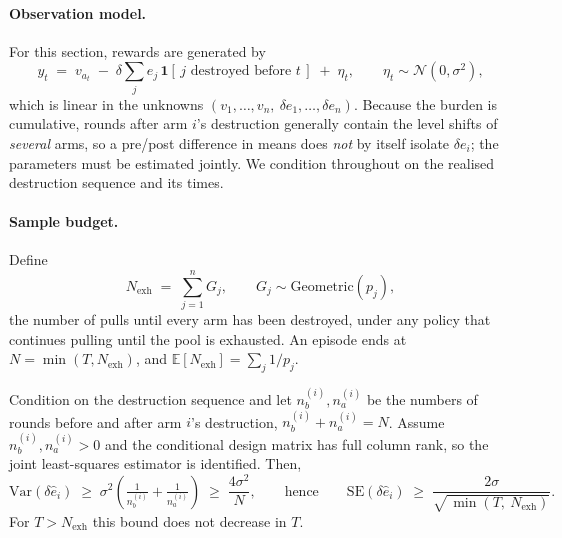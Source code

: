 \paragraph{Observation model.} For this section, rewards are generated by
\[
y_t \;=\; v_{a_t} \;-\; \delta \textstyle\sum_{j} e_j \,\mathbf{1}[\,j \text{ destroyed before } t\,] \;+\; \eta_t ,
\qquad \eta_t \sim \mathcal{N}(0,\sigma^2),
\]
which is linear in the unknowns $(v_1,\dots,v_n,\ \delta e_1,\dots,\delta e_n)$.
Because the burden is cumulative, rounds after arm $i$'s destruction generally
contain the level shifts of \emph{several} arms, so a pre/post difference in means
does \emph{not} by itself isolate $\delta e_i$; the parameters must be estimated
jointly. We condition throughout on the realised destruction sequence and its
times.

\paragraph{Sample budget.} Define
\[
N_{\mathrm{exh}} \;=\; \textstyle\sum_{j=1}^{n} G_j, \qquad G_j \sim \mathrm{Geometric}(p_j),
\]
the number of pulls until every arm has been destroyed, under any policy that
continues pulling until the pool is exhausted. An episode ends at
$N = \min(T, N_{\mathrm{exh}})$, and $\mathbb{E}[N_{\mathrm{exh}}] = \sum_j 1/p_j$.

\begin{theorem}
\label{thm:floor}
Condition on the destruction sequence and let $n_b^{(i)}, n_a^{(i)}$ be the numbers
of rounds before and after arm $i$'s destruction, $n_b^{(i)} + n_a^{(i)} = N$.
Assume $n_b^{(i)}, n_a^{(i)} > 0$ and the conditional design matrix has full
column rank, so the joint least-squares estimator is identified. Then,
\[
\mathrm{Var}(\delta \hat e_i) \;\ge\; \sigma^2\!\left(\tfrac{1}{n_b^{(i)}} + \tfrac{1}{n_a^{(i)}}\right)
\;\ge\; \frac{4\sigma^2}{N},
\qquad\text{hence}\qquad
\mathrm{SE}(\delta \hat e_i) \;\ge\; \frac{2\sigma}{\sqrt{\,\min(T,\ N_{\mathrm{exh}})}} .
\]
For $T > N_{\mathrm{exh}}$ this bound does not decrease in $T$.
\end{theorem}

